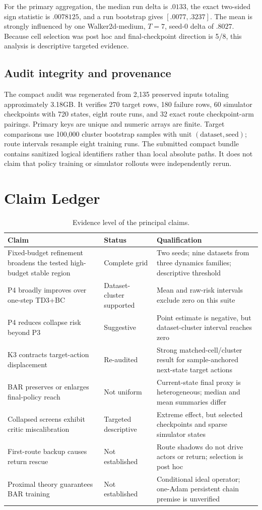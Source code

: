 \documentclass[letterpaper]{article}
\begin{document}
For the primary aggregation, the median run delta is $.0133$, the exact two-sided sign statistic is $.0078125$, and a run bootstrap gives $[.0077,.3237]$. The mean is strongly influenced by one Walker2d-medium, $T=7$, seed-0 delta of $.8027$. Because cell selection was post hoc and final-checkpoint direction is 5/8, this analysis is descriptive targeted evidence.

\subsection{Audit integrity and provenance}
The compact audit was regenerated from 2,135 preserved inputs totaling approximately 3.18GB. It verifies 270 target rows, 180 failure rows, 60 simulator checkpoints with 720 states, eight route runs, and 32 exact route checkpoint-arm pairings. Primary keys are unique and numeric arrays are finite. Target comparisons use 100,000 cluster bootstrap samples with unit $(\text{dataset},\text{seed})$; route intervals resample eight training runs. The submitted compact bundle contains sanitized logical identifiers rather than local absolute paths. It does not claim that policy training or simulator rollouts were independently rerun.

\section{Claim Ledger}
\label{app:ledger}
\begin{table}[h]
\caption{Evidence level of the principal claims.}
\centering
\small
\begin{tabular}{p{}p{}p{}}
\toprule
Claim&Status&Qualification\\
\midrule
Fixed-budget refinement broadens the tested high-budget stable region&Complete grid&Two seeds; nine datasets from three dynamics families; descriptive threshold\\
P4 broadly improves over one-step TD3+BC&Dataset-cluster supported&Mean and raw-risk intervals exclude zero on this suite\\
P4 reduces collapse risk beyond P3&Suggestive&Point estimate is negative, but dataset-cluster interval reaches zero\\
K3 contracts target-action displacement&Re-audited&Strong matched-cell/cluster result for sample-anchored next-state target actions\\
BAR preserves or enlarges final-policy reach&Not uniform&Current-state final proxy is heterogeneous; median and mean summaries differ\\
Collapsed screens exhibit critic miscalibration&Targeted descriptive&Extreme effect, but selected checkpoints and sparse simulator states\\
First-route backup causes return rescue&Not established&Route shadows do not drive actors or return; selection is post hoc\\
Proximal theory guarantees BAR training&Not established&Conditional ideal operator; one-Adam persistent chain premise is unverified\\
\bottomrule
\end{tabular}
\end{table}
\end{document}

